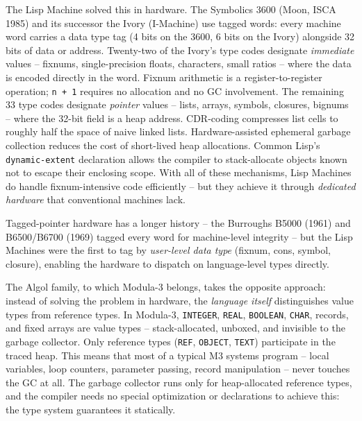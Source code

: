 \documentclass[
  12pt,
]{report}
\newcommand{\passthrough}[1]{#1}
\begin{document}
The Lisp Machine solved this in hardware. The Symbolics 3600 (Moon, ISCA
1985) and its successor the Ivory (I-Machine) use tagged words: every
machine word carries a data type tag (4 bits on the 3600, 6 bits on the
Ivory) alongside 32 bits of data or address. Twenty-two of the Ivory's
type codes designate \emph{immediate} values -- fixnums,
single-precision floats, characters, small ratios -- where the data is
encoded directly in the word. Fixnum arithmetic is a
register-to-register operation; \passthrough{\lstinline!n + 1!} requires
no allocation and no GC involvement. The remaining 33 type codes
designate \emph{pointer} values -- lists, arrays, symbols, closures,
bignums -- where the 32-bit field is a heap address. CDR-coding
compresses list cells to roughly half the space of naive linked lists.
Hardware-assisted ephemeral garbage collection reduces the cost of
short-lived heap allocations. Common Lisp's
\passthrough{\lstinline!dynamic-extent!} declaration allows the compiler
to stack-allocate objects known not to escape their enclosing scope.
With all of these mechanisms, Lisp Machines do handle fixnum-intensive
code efficiently -- but they achieve it through \emph{dedicated
hardware} that conventional machines lack.

Tagged-pointer hardware has a longer history -- the Burroughs B5000
(1961) and B6500/B6700 (1969) tagged every word for machine-level
integrity -- but the Lisp Machines were the first to tag by
\emph{user-level data type} (fixnum, cons, symbol, closure), enabling
the hardware to dispatch on language-level types directly.

The Algol family, to which Modula-3 belongs, takes the opposite
approach: instead of solving the problem in hardware, the \emph{language
itself} distinguishes value types from reference types. In Modula-3,
\passthrough{\lstinline!INTEGER!}, \passthrough{\lstinline!REAL!},
\passthrough{\lstinline!BOOLEAN!}, \passthrough{\lstinline!CHAR!},
records, and fixed arrays are value types -- stack-allocated, unboxed,
and invisible to the garbage collector. Only reference types
(\passthrough{\lstinline!REF!}, \passthrough{\lstinline!OBJECT!},
\passthrough{\lstinline!TEXT!}) participate in the traced heap. This
means that most of a typical M3 systems program -- local variables, loop
counters, parameter passing, record manipulation -- never touches the GC
at all. The garbage collector runs only for heap-allocated reference
types, and the compiler needs no special optimization or declarations to
achieve this: the type system guarantees it statically.
\end{document}

